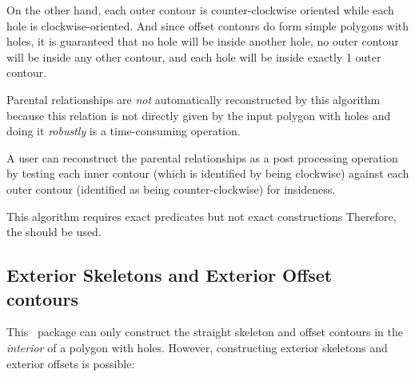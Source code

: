 On the other hand, each outer contour is counter-clockwise oriented while each hole is clockwise-oriented.
And since offset contours do form simple polygons with holes, it is guaranteed that no hole will be inside another hole, no outer contour will be inside any other contour, and each hole will be inside exactly 1 outer contour.

Parental relationships are {\em not} automatically reconstructed by this algorithm because this relation is not directly given by the input polygon with holes and doing it \textit{robustly} is a time-consuming operation.

A user can reconstruct the parental relationships as a post processing operation 
by testing each inner contour (which is identified by being clockwise) against each outer contour (identified as being counter-clockwise) for insideness.

This algorithm requires exact predicates but not exact constructions
Therefore, the  should be used.

\subsection{Exterior Skeletons and Exterior Offset contours}  

This \cgal\ package can only construct the straight skeleton and offset contours in the \textit{interior} of a polygon with holes. However, constructing exterior skeletons and exterior offsets is possible:

